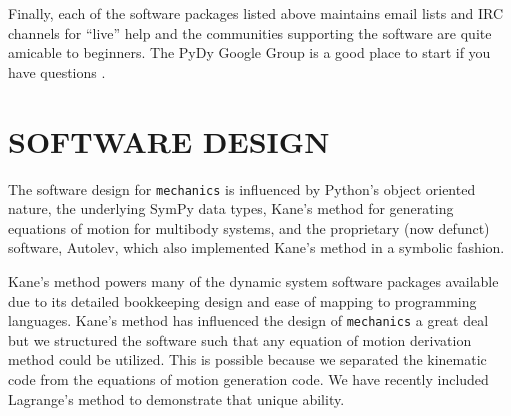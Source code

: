 \documentclass[twocolumn,10pt]{asme2e}
\begin{document}
Finally, each of the software packages listed above maintains email lists and
IRC channels for ``live'' help and the communities supporting the software are
quite amicable to beginners. The PyDy Google Group is a good place to start if
you have questions \cite{PyDyGoogleGroup}.
%
\section*{SOFTWARE DESIGN}
The software design for \verb|mechanics| is influenced by Python's object
oriented nature, the underlying SymPy data types, Kane’s method for generating
equations of motion\cite{Kane1985} for multibody systems, and the proprietary
(now defunct) software, Autolev\cite{Kane2000}, which also implemented Kane's
method in a symbolic fashion.

Kane’s method powers many of the dynamic system software packages available
\cite{Sayers1990, Englighten2013} due to its detailed bookkeeping design and
ease of mapping to programming languages. Kane’s method  has influenced the
design of \verb|mechanics| a great deal but we structured the software such
that any equation of motion derivation method could be utilized. This is
possible because we separated the kinematic code from the equations of motion
generation code. We have recently included Lagrange’s method to demonstrate
that unique ability.
\end{document}
